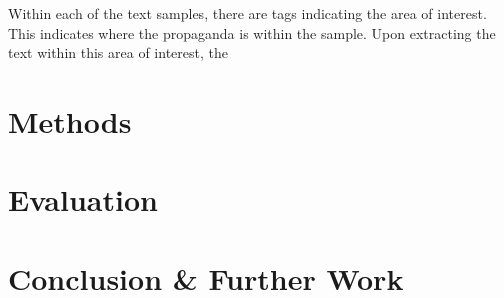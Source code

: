 \documentclass[twocolumn]{article}
\begin{document}
Within each of the text samples, there are tags indicating the area of interest. This indicates where the propaganda is within the sample. Upon extracting the text within this area of interest, the 

\section{Methods}

\section{Evaluation}

\section{Conclusion \& Further Work}

\printbibliography
\end{document}
